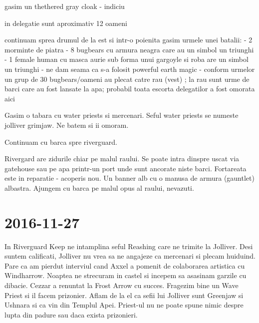 \documentclass[12pt,twoside]{book}
\begin{document}
gasim un thethered gray cloak - indiciu

in delegatie sunt aproximativ 12 oameni


continuam sprea drumul de la est si intr-o poienita gasim
urmele unei batalii:
- 2 morminte de piatra
- 8 bugbears cu armura neagra care au un simbol un triunghi
- 1 female human cu masca aurie sub forma unui gargoyle si roba are un simbol un triunghi
- ne dam seama ca s-a folosit powerful earth magic
- conform urmelor un grup de 30 bugbears/oameni au plecat catre rau (vest) ; la rau sunt 
urme de barci care au fost lansate la apa; probabil toata escorta delegatilor a 
fost omorata aici


Gasim o tabara cu water priests si mercenari. Seful water priests 
se numeste jolliver grimjaw.
Ne batem si ii omoram.

Continuam cu barca spre riverguard.

Rivergard are zidurile chiar pe malul raului. Se poate intra dinspre uscat via gatehouse sau
pe apa printr-un port unde sunt ancorate niste barci.
Fortareata este in reparatie - acoperis nou. Un banner alb cu o manusa de 
armura (gauntlet) albastra.
Ajungem cu barca pe malul opus al raului, nevazuti. 

\section{2016-11-27}

In Riverguard Keep ne intamplina seful Reashing care ne trimite la Jolliver.
Desi suntem calificati, Jolliver nu vrea sa ne angajeze ca mercenari si plecam 
huiduind. Pare ca am pierdut interviul cand Axxel a pomenit de colaborarea artistica
cu Windharrow.
Noaptea ne strecuram in  castel si incepem sa asasinam garzile cu dibacie. Cezzar a
renuntat la Frost Arrow cu succes.
Fragezim bine un Wave Priest si il facem prizonier. Aflam de la el ca sefii lui Jolliver sunt Greenjaw si Ushnara si ca vin din Templul Apei. Priest-ul nu ne poate spune nimic despre
lupta din padure sau daca exista prizonieri.
\end{document}

